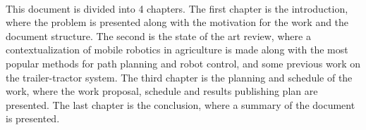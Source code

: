 \paragraph{}This document is divided into 4 chapters. The first chapter is the introduction, 
where the problem is presented along with the motivation for the work and the document structure. 
The second is the state of the art review, where a contextualization of mobile robotics in agriculture is made 
along with the most popular methods for path planning and robot control, and some previous work 
on the trailer-tractor system. The third chapter is the planning and schedule of the work, 
where the work proposal, schedule and results publishing plan are presented. The last chapter is the 
conclusion, where a summary of the document is presented.